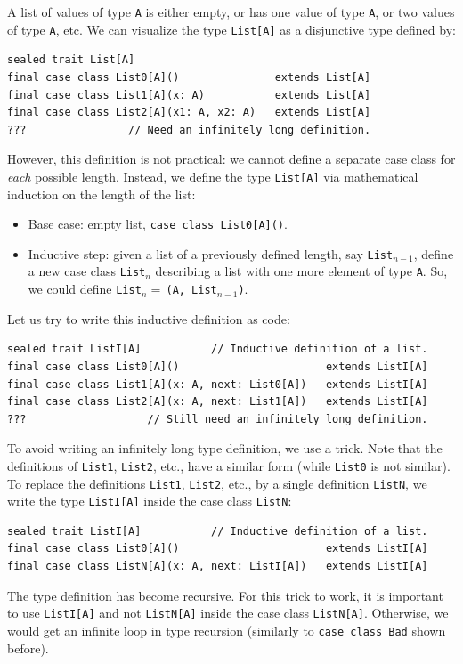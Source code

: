A list of values of type \lstinline!A! is either empty, or has one
value of type \lstinline!A!, or two values of type \lstinline!A!,
etc. We can visualize the type \lstinline!List[A]! as a disjunctive
type defined by:
\begin{lstlisting}
sealed trait List[A]
final case class List0[A]()               extends List[A]
final case class List1[A](x: A)           extends List[A]
final case class List2[A](x1: A, x2: A)   extends List[A]
???                // Need an infinitely long definition.
\end{lstlisting}
However, this definition is not practical: we cannot define a separate
case class for \emph{each} possible length. Instead, we define the
type \lstinline!List[A]! via mathematical induction on the length
of the list:
\begin{itemize}
\item Base case: empty list, \lstinline!case class List0[A]()!.
\item Inductive step: given a list of a previously defined length, say \lstinline!List!$_{n-1}$,
define a new case class \lstinline!List!$_{n}$ describing a list
with one more element of type \lstinline!A!. So, we could define
\lstinline!List!$_{n}=\,$\lstinline!(A, List!$_{n-1}$\lstinline!)!.
\end{itemize}
Let us try to write this inductive definition as code:
\begin{lstlisting}
sealed trait ListI[A]           // Inductive definition of a list.
final case class List0[A]()                       extends ListI[A]
final case class List1[A](x: A, next: List0[A])   extends ListI[A]
final case class List2[A](x: A, next: List1[A])   extends ListI[A]
???                   // Still need an infinitely long definition.
\end{lstlisting}
To avoid writing an infinitely long type definition, we use a trick.
Note that the definitions of \lstinline!List1!, \lstinline!List2!,
etc., have a similar form (while \lstinline!List0! is not similar).
To replace the definitions \lstinline!List1!, \lstinline!List2!,
etc., by a single definition \lstinline!ListN!, we write the type
\lstinline!ListI[A]! inside the case class \lstinline!ListN!:
\begin{lstlisting}
sealed trait ListI[A]           // Inductive definition of a list.
final case class List0[A]()                       extends ListI[A]
final case class ListN[A](x: A, next: ListI[A])   extends ListI[A]
\end{lstlisting}
The type definition has become recursive. For this trick to work,
it is important to use \lstinline!ListI[A]! and not \lstinline!ListN[A]!
inside the case class \lstinline!ListN[A]!. Otherwise, we would get
an infinite loop in type recursion
(similarly to \lstinline!case class Bad! shown before).

